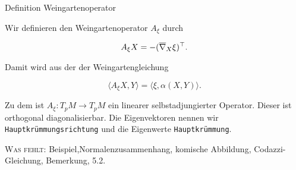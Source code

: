 \documentclass[a6paper,11pt,grid=front]{kartei}
\newcommand{\fl}[1]{\begin{flushleft}
 #1 \end{flushleft}}
\newcommand{\blf}[1]{\langle #1 \rangle}
\newcounter{def}
\begin{document}
\nonameyet
{Definition} {Weingartenoperator}
{
	\small
\fl{Wir definieren den Weingartenoperator $A_\xi$ durch}
\[
A_\xi X = -(\M[\nabla]_X \xi)^\top.
\]
\fl{Damit wird aus der der Weingartengleichung}
\[
\blf{A_\xi X,Y} = \blf{\xi,\alpha(X,Y)}.
\]
\fl{Zu dem ist $A_\xi :T_pM \to T_pM$ ein linearer selbstadjungierter 
Operator. Dieser ist orthogonal diagonalisierbar. Die Eigenvektoren
nennen wir \texttt{Hauptkrümmungsrichtung} und die Eigenwerte 
\texttt{Hauptkrümmung}.}
\tiny 
\fl{\textsc{Was fehlt:}  Beispiel,Normalenzusammenhang,
		komische Abbildung,
		Codazzi-Gleichung,
		Bemerkung, 5.2.}
}
{}
\end{document}

